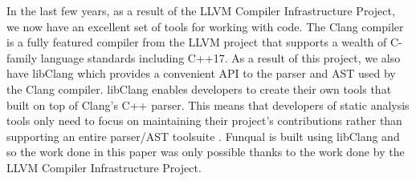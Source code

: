 In the last few years, as a result of the LLVM Compiler Infrastructure Project, we now have an excellent set of tools for working with code.  The Clang compiler is a fully featured compiler from the LLVM project that supports a wealth of C-family language standards including C++17.  As a result of this project, we also have libClang which provides a convenient API to the parser and AST used by the Clang compiler.  libClang enables developers to create their own tools that built on top of Clang's C++ parser.  This means that developers of static analysis tools only need to focus on maintaining their project's contributions rather than supporting an entire parser/AST toolsuite \cite{libclang-survey}.  Funqual is built using libClang and so the work done in this paper was only possible thanks to the work done by the LLVM Compiler Infrastructure Project.  
